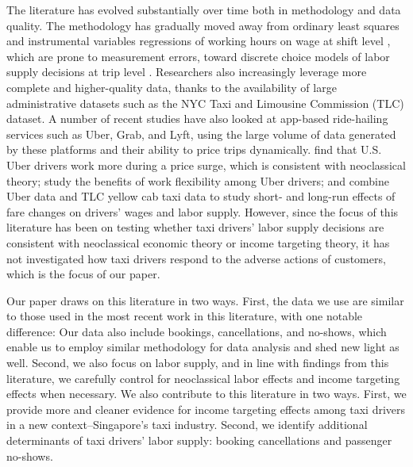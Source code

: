 \documentclass[reviewmode]{restat}
\begin{document}
The literature has evolved substantially over time  both in methodology and data quality.
The methodology has gradually moved away from ordinary least squares and instrumental variables
regressions of working hours on wage  at shift level \citep{camerer1997labor}, which are prone to
measurement errors, toward discrete choice models of labor supply decisions at trip level \citep{farber2005tomorrow,farber2015you,crawford2011new,martin2017quit}. Researchers also increasingly 
leverage more complete and higher-quality data, thanks to the availability of large administrative 
datasets such as the NYC Taxi and Limousine Commission (TLC) dataset. A number of recent studies
have also looked at app-based ride-hailing services such as Uber, Grab, and Lyft, using the large 
volume of data generated by these platforms and their ability to price trips dynamically. 
\citet{chen2015dynamic} find that U.S. Uber drivers work more during a price surge, 
which is consistent with neoclassical theory; \citet{chen2017value} study the benefits of 
work flexibility among Uber drivers; and \citet{hall2017labor} combine Uber data and TLC yellow
cab taxi data to study short- and long-run effects of fare changes on drivers' wages and labor supply. 
However, since the focus of this literature has been on testing whether taxi drivers' labor supply
decisions are consistent with neoclassical economic theory or income targeting theory, 
it has not investigated how taxi drivers respond to the adverse actions of customers, 
which is the focus of our paper.

Our paper draws on this literature in two ways. First, the data we use are similar to those used 
in the most recent work in this literature, with one notable difference: Our data also include bookings,
cancellations, and no-shows, which enable us to employ similar methodology for data analysis and 
shed new light as well. Second, we also focus on labor supply, and in line with findings from this
literature, we carefully control for neoclassical labor effects and income targeting effects when 
necessary. We also contribute to this literature in two ways. First, we provide more and cleaner
evidence for income targeting effects among taxi drivers in a new context--Singapore's taxi industry.
Second, we identify  additional determinants of taxi drivers' labor supply: booking cancellations and passenger no-shows.

\end{document}
